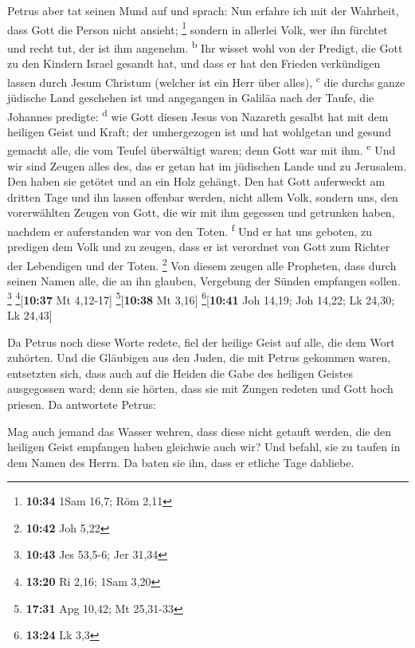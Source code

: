  Petrus aber tat seinen Mund auf und sprach: Nun erfahre
ich mit der Wahrheit, dass Gott die Person nicht ansieht; \footnote{\textbf{10:34}
  1Sam 16,7; Röm 2,11}  sondern in allerlei Volk, wer ihn
fürchtet und recht tut, der ist ihm angenehm. \textsuperscript{b}
 Ihr wisset wohl von der Predigt, die Gott zu den Kindern
Israel gesandt hat, und dass er hat den Frieden verkündigen lassen durch
Jesum Christum (welcher ist ein Herr über alles), \textsuperscript{c}
 die durchs ganze jüdische Land geschehen ist und
angegangen in Galiläa nach der Taufe, die Johannes predigte:
\textsuperscript{d}  wie Gott diesen Jesus von Nazareth
gesalbt hat mit dem heiligen Geist und Kraft; der umhergezogen ist und
hat wohlgetan und gesund gemacht alle, die vom Teufel überwältigt waren;
denn Gott war mit ihm. \textsuperscript{e}  Und wir sind
Zeugen alles des, das er getan hat im jüdischen Lande und zu Jerusalem.
Den haben sie getötet und an ein Holz gehängt.  Den hat
Gott auferweckt am dritten Tage und ihn lassen offenbar werden,
 nicht allem Volk, sondern uns, den vorerwählten Zeugen
von Gott, die wir mit ihm gegessen und getrunken haben, nachdem er
auferstanden war von den Toten. \textsuperscript{f}  Und
er hat uns geboten, zu predigen dem Volk und zu zeugen, dass er ist
verordnet von Gott zum Richter der Lebendigen und der Toten. \footnote{\textbf{10:42}
  Joh 5,22}  Von diesem zeugen alle Propheten, dass durch
seinen Namen alle, die an ihn glauben, Vergebung der Sünden empfangen
sollen. \footnote{\textbf{10:43} Jes 53,5-6; Jer 31,34}
\footnote{\textbf{13:20} Ri 2,16; 1Sam 3,20}{[}\textbf{10:37} Mt
4,12-17{]} \footnote{\textbf{17:31} Apg 10,42; Mt 25,31-33}{[}\textbf{10:38}
Mt 3,16{]} \footnote{\textbf{13:24} Lk 3,3}{[}\textbf{10:41} Joh 14,19;
Joh 14,22; Lk 24,30; Lk 24,43{]}

 Da Petrus noch diese Worte redete, fiel der heilige
Geist auf alle, die dem Wort zuhörten.  Und die Gläubigen
aus den Juden, die mit Petrus gekommen waren, entsetzten sich, dass auch
auf die Heiden die Gabe des heiligen Geistes ausgegossen ward;
 denn sie hörten, dass sie mit Zungen redeten und Gott
hoch priesen. Da antwortete Petrus:

 Mag auch jemand das Wasser wehren, dass diese nicht
getauft werden, die den heiligen Geist empfangen haben gleichwie auch
wir?  Und befahl, sie zu taufen in dem Namen des Herrn.
Da baten sie ihn, dass er etliche Tage dabliebe.

